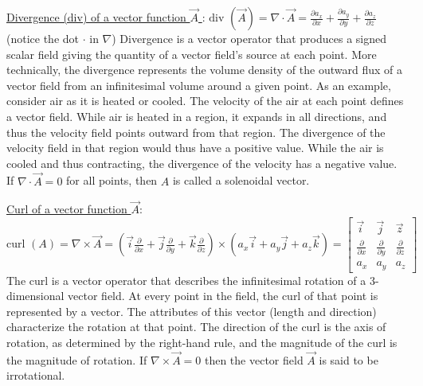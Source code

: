 \documentclass[12pt]{article}
\def\div{\text{div\ }} %
\def\curl{\text{curl\ }} %
\begin{document}
\begin{flushleft}
	\textbullet \quad \uline{Divergence (div) of a vector function $\vec{A}$ }: \linebreak 
	$\displaystyle \div (\vec{A}) = \nabla \cdot \vec{A} = \frac{\partial a_x}{\partial x} + \frac{\partial a_y}{\partial y} + \frac{\partial a_z}{\partial z} $ (notice the dot $\cdot$ in $\nabla$) \linebreak 
	Divergence is a vector operator that produces a signed scalar field giving the quantity of a vector field's source at each point. More technically, the divergence represents the volume density of the outward flux of a vector field from an infinitesimal volume around a given point. \linebreak 
	As an example, consider air as it is heated or cooled. The velocity of the air at each point defines a vector field. While air is heated in a region, it expands in all directions, and thus the velocity field points outward from that region. The divergence of the velocity field in that region would thus have a positive value. While the air is cooled and thus contracting, the divergence of the velocity has a negative value. \linebreak 
	\textbullet \quad If $\displaystyle \nabla \cdot \vec{A} = 0$ for all points, then $A$ is called a solenoidal vector. \linebreak 

	\textbullet \quad \uline{Curl of a vector function $\vec{A}$}: \linebreak 
	$\displaystyle \curl (A) = \nabla \times \vec{A} = \left( \vec{i} \frac{\partial}{\partial x} + \vec{j} \frac{\partial}{\partial y} + \vec{k} \frac{\partial}{\partial z} \right) \times \left( a_x \vec{i} + a_y \vec{j} + a_z \vec{k} \right) = 
	\begin{bmatrix}
		\vec{i} & \vec{j} & \vec{z} \\ 
		\frac{\partial}{\partial x} & \frac{\partial}{\partial y} & \frac{\partial }{\partial z} \\ 
		a_x & a_y & a_z 
	\end{bmatrix} $ \linebreak 
	The curl is a vector operator that describes the infinitesimal rotation of a 3-dimensional vector field. At every point in the field, the curl of that point is represented by a vector. The attributes of this vector (length and direction) characterize the rotation at that point. \linebreak 
	The direction of the curl is the axis of rotation, as determined by the right-hand rule, and the magnitude of the curl is the magnitude of rotation. \linebreak 
	\textbullet \quad If $\nabla \times \vec{A} = 0$ then the vector field $\vec{A}$ is said to be irrotational. \linebreak 
	

\end{flushleft}
\end{document}
